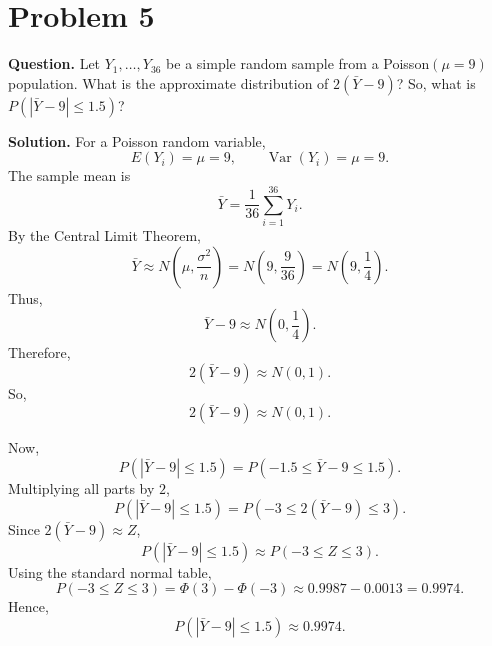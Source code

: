 \documentclass[11pt]{article}
\begin{document}
\section*{Problem 5}

\textbf{Question.} Let $Y_1,\ldots,Y_{36}$ be a simple random sample from a Poisson$(\mu=9)$ population. What is the approximate distribution of $2(\bar Y-9)$? So, what is $P(|\bar Y-9|\le 1.5)$?

\textbf{Solution.} For a Poisson random variable,
\[
E(Y_i)=\mu=9, \qquad \operatorname{Var}(Y_i)=\mu=9.
\]
The sample mean is
\[
\bar Y=\frac{1}{36}\sum_{i=1}^{36}Y_i.
\]
By the Central Limit Theorem,
\[
\bar Y\approx N\left(\mu,\frac{\sigma^2}{n}\right)=N\left(9,\frac{9}{36}\right)=N\left(9,\frac14\right).
\]
Thus,
\[
\bar Y-9\approx N\left(0,\frac14\right).
\]
Therefore,
\[
2(\bar Y-9)\approx N(0,1).
\]
So,
\[
\boxed{2(\bar Y-9)\approx N(0,1)}.
\]

Now,
\[
P(|\bar Y-9|\le 1.5)=P(-1.5\le \bar Y-9\le 1.5).
\]
Multiplying all parts by $2$,
\[
P(|\bar Y-9|\le 1.5)=P(-3\le 2(\bar Y-9)\le 3).
\]
Since $2(\bar Y-9)\approx Z$,
\[
P(|\bar Y-9|\le 1.5)\approx P(-3\le Z\le 3).
\]
Using the standard normal table,
\[
P(-3\le Z\le 3)=\Phi(3)-\Phi(-3)\approx 0.9987-0.0013=0.9974.
\]
Hence,
\[
\boxed{P(|\bar Y-9|\le 1.5)\approx 0.9974}.
\]

\newpage
\end{document}

